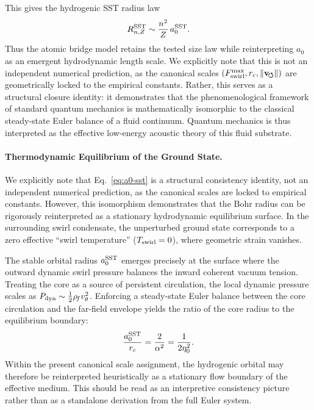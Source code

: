\documentclass[11pt,a4paper]{article}
\newcommand{\rc}{r_c}
\newcommand{\rhoF}{\rho_{\!f}}
\begin{document}
    This gives the hydrogenic SST radius law
    \begin{equation}
        \label{eq:RnZ}
        R_{n,Z}^{\rm SST}\sim \frac{n^2}{Z}\,a_0^{\rm SST}.
    \end{equation}
    Thus the atomic bridge model retains the tested size law while reinterpreting $a_0$ as an emergent hydrodynamic length scale. We explicitly note that this is not an independent numerical prediction, as the canonical scales $(F_{\rm swirl}^{\max},\rc,\lVert\mathbf{v}_{\!\boldsymbol{\circlearrowleft}}\rVert)$ are geometrically locked to the empirical constants. Rather, this serves as a structural closure identity: it demonstrates that the phenomenological framework of standard quantum mechanics is mathematically isomorphic to the classical steady-state Euler balance of a fluid continuum. Quantum mechanics is thus interpreted as the effective low-energy acoustic theory of this fluid substrate.
    
    \paragraph{Thermodynamic Equilibrium of the Ground State.}
        We explicitly note that Eq.~\eqref{eq:a0-sst} is a structural consistency identity, not an independent numerical prediction, as the canonical scales are locked to empirical constants. However, this isomorphism demonstrates that the Bohr radius can be rigorously reinterpreted as a stationary hydrodynamic equilibrium surface. In the surrounding swirl condensate, the unperturbed ground state corresponds to a zero effective ``swirl temperature'' ($T_{\rm swirl} = 0$), where geometric strain vanishes.
        
        The stable orbital radius $a_0^{\rm SST}$ emerges precisely at the surface where the outward dynamic swirl pressure balances the inward coherent vacuum tension. Treating the core as a source of persistent circulation, the local dynamic pressure scales as $P_{\rm dyn} \sim \frac{1}{2}\rhoF v_\theta^2$. Enforcing a steady-state Euler balance between the core circulation and the far-field envelope yields the ratio of the core radius to the equilibrium boundary:
        \begin{equation}
            \label{eq:PressureBalance}
            \frac{a_0^{\rm SST}}{\rc}
            =
            \frac{2}{\alpha^2}
            =
            \frac{1}{2\eta_0^2}.
        \end{equation}
        Within the present canonical scale assignment, the hydrogenic orbital may therefore be reinterpreted heuristically as a stationary flow boundary of the effective medium. This should be read as an interpretive consistency picture rather than as a standalone derivation from the full Euler system.
    
\end{document}
